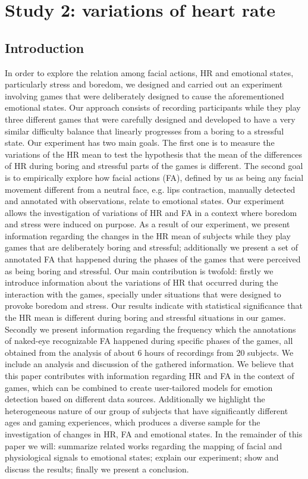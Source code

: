 \section{Study 2: variations of heart rate}

\subsection{Introduction}

In order to explore the relation among facial actions, HR and emotional states, particularly stress and boredom, we designed and carried out an experiment involving games that were deliberately designed to cause the aforementioned emotional states. Our approach consists of recording participants while they play three different games that were carefully designed and developed to have a very similar difficulty balance that linearly progresses from a boring to a stressful state. Our experiment has two main goals. The first one is to measure the variations of the HR mean to test the hypothesis that the mean of the differences of HR during boring and stressful parts of the games is different. The second goal is to empirically explore how facial actions (FA), defined by us as being any facial movement different from a neutral face, e.g. lips contraction, manually detected and annotated with observations, relate to emotional states. Our experiment allows the investigation of variations of HR and FA in a context where boredom and stress were induced on purpose. As a result of our experiment, we present information regarding the changes in the HR mean of subjects while they play games that are deliberately boring and stressful; additionally we present a set of annotated FA that happened during the phases of the games that were perceived as being boring and stressful. Our main contribution is twofold: firstly we introduce information about the variations of HR that occurred during the interaction with the games, specially under situations that were designed to provoke boredom and stress. Our results indicate with statistical significance that the HR mean is different during boring and stressful situations in our games. Secondly we present information regarding the frequency which the annotations of naked-eye recognizable FA happened during specific phases of the games, all obtained from the analysis of about 6 hours of recordings from 20 subjects. We include an analysis and discussion of the gathered information. We believe that this paper contributes with information regarding HR and FA in the context of games, which can be combined to create user-tailored models for emotion detection based on different data sources. Additionally we highlight the heterogeneous nature of our group of subjects that have significantly different ages and gaming experiences, which produces a diverse sample for the investigation of changes in HR, FA and emotional states. In the remainder of this paper we will: summarize related works regarding the mapping of facial and physiological signals to emotional states; explain our experiment; show and discuss the results; finally we present a conclusion.

